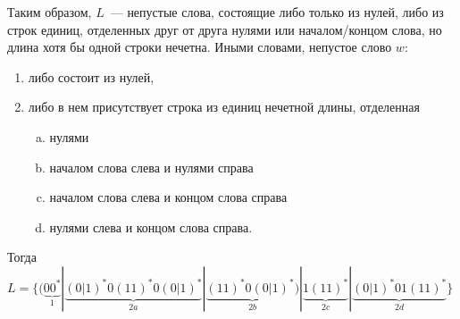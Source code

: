 \documentclass[a4paper]{article}
\begin{document}
Таким образом, $L$~--- непустые слова, состоящие либо только из нулей, либо из строк единиц, отделенных друг от друга нулями или началом/концом слова, но длина хотя бы одной строки нечетна. Иными словами, непустое слово $w$:
\begin{enumerate}[1.]
\item либо состоит из нулей,
\item либо в нем присутствует строка из единиц нечетной длины, отделенная
\begin{enumerate}[a.]
 \item нулями
 \item началом слова слева и нулями справа
 \item началом слова слева и концом слова справа
 \item нулями слева и концом слова справа.
\end{enumerate}
\end{enumerate}
Тогда $L=\{(\underbrace{00^*}_{1}|\underbrace{{(0|1)}^*0{(11)}^*0{(0|1)}^*}_{2a}|\underbrace{{(11)}^*0{(0|1)}^*)}_{2b}|\underbrace{1{(11)}^*}_{2c}|\underbrace{{(0|1)}^*01{(11)}^*}_{2d}\}$
\end{document}
